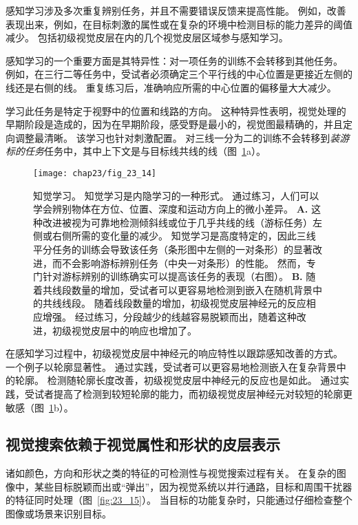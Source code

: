 感知学习涉及多次重复辨别任务，并且不需要错误反馈来提高性能。
例如，改善表现出来，例如，在目标刺激的属性或在复杂的环境中检测目标的能力差异的阈值减少。
包括初级视觉皮层在内的几个视觉皮层区域参与感知学习。


感知学习的一个重要方面是其特异性：对一项任务的训练不会转移到其他任务。
例如，在三行二等任务中，受试者必须确定三个平行线的中心位置是更接近左侧的线还是右侧的线。
重复练习后，准确响应所需的中心位置的偏移量大大减少。


学习此任务是特定于视野中的位置和线路的方向。
这种特异性表明，视觉处理的早期阶段是造成的，因为在早期阶段，感受野是最小的，视觉图最精确的，并且定向调整最清晰。
该学习也针对刺激配置。
对三线一分为二的训练不会转移到\textit{装游标的任务}任务中，其中上下文是与目标线共线的线（图~\ref{fig:23_14}a）。


\begin{figure}[htbp]
	\centering
	\texttt{[image: chap23/fig\_23\_14]}
	\caption{知觉学习。
		知觉学习是内隐学习的一种形式。
		通过练习，人们可以学会辨别物体在方位、位置、深度和运动方向上的微小差异。
		\textbf{A.} 这种改进被视为可靠地检测倾斜线或位于几乎共线的线（游标任务）左侧或右侧所需的变化量的减少。
		知觉学习是高度特定的，因此三线平分任务的训练会导致该任务（条形图中左侧的一对条形）的显著改进，而不会影响游标辨别任务（中央一对条形）的性能。
		然而，专门针对游标辨别的训练确实可以提高该任务的表现（右图）。
		\textbf{B.} 随着共线段数量的增加，受试者可以更容易地检测到嵌入在随机背景中的共线线段。
		随着线段数量的增加，初级视觉皮层神经元的反应相应增强。
		经过练习，分段越少的线越容易脱颖而出，随着这种改进，初级视觉皮层中的响应也增加了\cite{crist2001learning,li2008learning}。}
	\label{fig:23_14}
\end{figure}


在感知学习过程中，初级视觉皮层中神经元的响应特性以跟踪感知改善的方式。
一个例子以轮廓显著性。
通过实践，受试者可以更容易地检测嵌入在复杂背景中的轮廓。
检测随轮廓长度改善，初级视觉皮层中神经元的反应也是如此。
通过实践，受试者提高了检测到较短轮廓的能力，而初级视觉皮层神经元对较短的轮廓更敏感（图~\ref{fig:23_14}b）。



\subsection{视觉搜索依赖于视觉属性和形状的皮层表示}

诸如颜色，方向和形状之类的特征的可检测性与视觉搜索过程有关。
在复杂的图像中，某些目标脱颖而出或“弹出”，因为视觉系统以并行通路，目标和周围干扰器的特征同时处理（图~\ref{fig:23_15}）。
当目标的功能复杂时，只能通过仔细检查整个图像或场景来识别目标。


